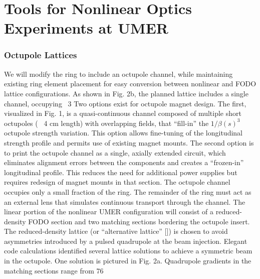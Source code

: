 \renewcommand{\thechapter}{4}

\chapter{Tools for Nonlinear Optics Experiments at UMER}
\label{ch:NLtools}




\subsection{Octupole Lattices}

We will modify the ring to include an octupole channel, while maintaining existing ring element placement for easy conversion between nonlinear and FODO lattice configurations. As shown in Fig. 2b, the planned lattice includes a single channel, occupying ~3%
Two options exist for octupole magnet design. The first, visualized in Fig. 1, is a quasi-continuous channel composed of multiple short octupoles (~ 4 cm length) with overlapping fields, that “fill-in” the $1/\beta(s)^3$ octupole strength variation. This option allows fine-tuning of the longitudinal strength profile and permits use of existing magnet mounts. The second option is to print the octupole channel as a single, axially extended circuit, which eliminates alignment errors between the components and creates a “frozen-in” longitudinal profile. This reduces the need for additional power supplies but requires redesign of magnet mounts in that section.
The octupole channel occupies only a small fraction of the ring. The remainder of the ring must act as an external lens that simulates continuous transport through the channel. The linear portion of the nonlinear UMER configuration will consist of a reduced-density FODO section and two matching sections bordering the octupole insert. The reduced-density lattice (or “alternative lattice” []) is chosen to avoid asymmetries introduced by a pulsed quadrupole at the beam injection. Elegant code calculations identified several lattice solutions to achieve a symmetric beam in the octupole. One solution is pictured in Fig. 2a.  Quadrupole gradients in the matching sections range from 76%
